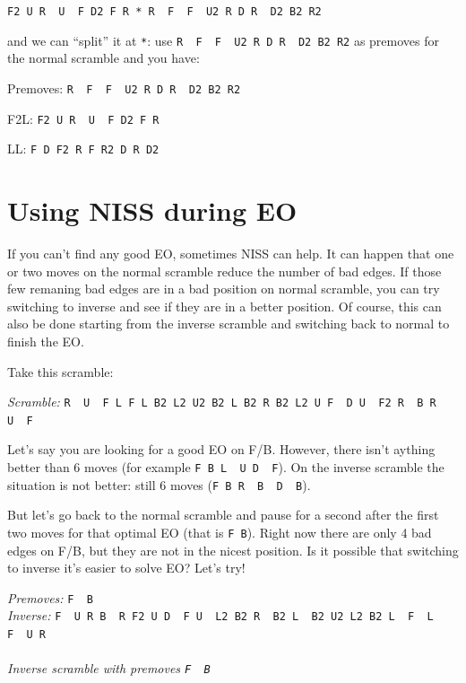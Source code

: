 \documentclass[11pt,a4paper]{book}
\newcommand{\p}{\textquotesingle}
\newcommand{\m}{\texttt}
\newcommand{\ps}{\p\,\,}
\begin{document}
\begin{center}
\m{F2 U R\ps U\ps F D2 F R * R\ps F\ps F\ps U2 R D R\ps D2 B2 R2}
\end{center}

and we can ``split'' it at \m{*}: use \m{R\ps F\ps F\ps U2 R D R\ps D2 B2 R2} as premoves for the normal scramble and you have:

\bigskip
Premoves: \m{R\ps F\ps F\ps U2 R D R\ps D2 B2 R2}

F2L: \m{F2 U R\ps U\ps F D2 F R}

LL: \m{F D F2 R F R2 D R D2}

\section{Using NISS during EO}
\label{sec:NISSEO}

If you can't find any good EO, sometimes NISS can help. It can happen that one or two moves on the normal scramble reduce the number of bad edges. If those few remaning bad edges are in a bad position on normal scramble, you can try switching to inverse and see if they are in a better position. Of course, this can also be done starting from the inverse scramble and switching back to normal to finish the EO.

Take this scramble:
\begin{center}
\emph{Scramble:} \m{R\ps U\ps F L F L B2 L2 U2 B2 L B2 R B2 L2 U F\ps D U\ps F2 R\ps B R\ps U\ps F}\\

\end{center}
Let's say you are looking for a good EO on F/B. However, there isn't aything better than 6 moves (for example \m{F B L\ps U D\ps F}). On the inverse scramble the situation is not better: still 6 moves (\m{F B R\ps B\ps D\ps B}).

But let's go back to the normal scramble and pause for a second after the first two moves for that optimal EO (that is \m{F B}). Right now there are only 4 bad edges on F/B, but they are not in the nicest position. Is it possible that switching to inverse it's easier to solve EO? Let's try!

\begin{center}
\emph{Premoves:} \m{F\ps B\p}\\
\emph{Inverse:} \m{F\ps U R B\ps R F2 U D\ps F U\ps L2 B2 R\ps B2 L\ps B2 U2 L2 B2 L\ps F\ps L\ps F\ps U R}\\
\\
\emph{Inverse scramble with premoves \m{F\ps B\p}}
\end{center}
\end{document}
